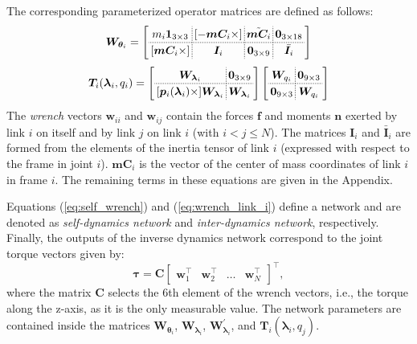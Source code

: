 The corresponding parameterized operator matrices are defined as follows:
\begin{equation}
\bm{W}_{\bm{\theta}_i}=\left[
	\arraycolsep=1.9pt\def\arraystretch{1.2}
    \begin{array}{c;{1pt/1pt}c;{1pt/1pt}c;{1pt/1pt}c}
m_i \bm{1}_{3\times3} & [-\bm{mC}_i \times] & \tilde{\bm{mC}_i} & \bm{0}_{3\times18}\\ \hdashline[1pt/1pt]
[\bm{mC}_i \times] & \bm{I}_i & \bm{0}_{3\times9} & \bar{\bm{I}}_i
    \end{array}
\right]
\label{eq:dyn_weights_mat}
\end{equation}
\begin{equation}
\bm{T}_{i}(\bm{\lambda}_i,q_i)=\left[
	\arraycolsep=1.9pt\def\arraystretch{1.2}
    \begin{array}{c;{1pt/1pt}c}
\bm{W}_{\bm{\lambda}_i} & \bm{0}_{3\times9}\\ \hdashline[1pt/1pt]
[\bm{p}_i(\bm{\lambda}_i) \times]\bm{W}_{\bm{\lambda}_i} & \bm{W}_{\bm{\lambda}_i}
    \end{array}
\right]\left[
	\arraycolsep=1.9pt\def\arraystretch{1.2}
    \begin{array}{c;{1pt/1pt}c}
\bm{W}_{q_i} & \bm{0}_{9\times3}\\ \hdashline[1pt/1pt]
\bm{0}_{9\times3} & \bm{W}_{q_i}
    \end{array}
\right]
\label{eq:rot_mat}
\end{equation}
The \textit{wrench} vectors $\bm{w}_{ii}$ and $\bm{w}_{ij}$ contain the forces $\bm{f}$ and moments $\bm{n}$ exerted by link $i$ on itself and by link $j$ on link $i$ (with $i<j\leq N$). The matrices $\bm{I}_i$ and $\bm{\bar{I}}_i$ are formed from the elements of the inertia tensor of link $i$ (expressed with respect to the frame in joint $i$). $\bm{mC}_i$ is the vector of the center of mass coordinates of link $i$ in frame $i$. The remaining terms in these equations are given in the Appendix.

Equations (\ref{eq:self_wrench}) and (\ref{eq:wrench_link_i}) define a network and are denoted as \emph{self-dynamics network} and \emph{inter-dynamics network}, respectively. Finally, the outputs of the inverse dynamics network correspond to the joint torque vectors given by:
\begin{equation}
\bm{\tau}= \bm{C}\begin{bmatrix}
\bm{w}_1^\intercal & \bm{w}_2^\intercal & \ldots & \bm{w}_N^\intercal\end{bmatrix}^\intercal,
\label{eq:inv_dyn}
\end{equation}
where the matrix $\bm{C}$ selects the 6th element of the wrench vectors, i.e., the torque along the z-axis, as it is the only measurable value. The network parameters are contained inside the matrices $\bm{W}_{\bm{\theta}_i}$, $\bm{W}_{\bm{\lambda}_i}$, $\bm{W}^\prime_{\bm{\lambda}_i}$, and $\bm{T}_i(\bm{\lambda}_i,q_j)$.

